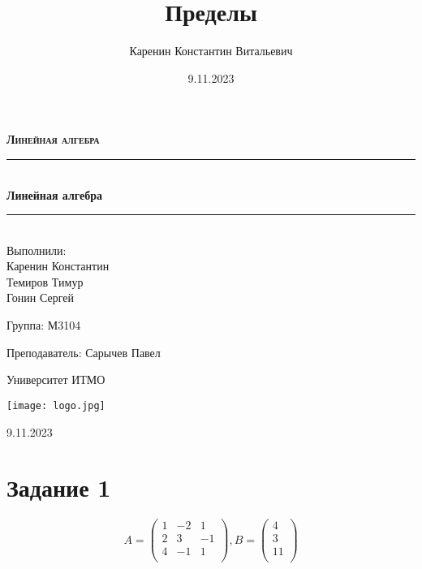 \documentclass{article}
\title{Пределы}
\author{Каренин Константин Витальевич}
\date{9.11.2023}
\begin{document}
\begin{titlepage}
    \centering
    \vspace*{0.5 cm}
    
    \textsc{\LARGE \textbf{Линейная алгебра}}
    \vspace{1.5cm}
    
    \rule{\linewidth}{0.2 mm} \\[0.4 cm]
    { \huge \bfseries Линейная алгебра}
    \rule{\linewidth}{0.2 mm} \\[1.5 cm]
    
    \Large Выполнили: \\
    Каренин Константин \\
    Темиров Тимур \\
    Гонин Сергей \\
    
    \vspace{0.5cm}
    
    Группа: М3104
    
    \vspace{0.5cm}
    
    Преподаватель: Сарычев Павел
    
    \vspace{0.5cm}
    
    Университет ИТМО
    
    \vfill

    \texttt{[image: logo.jpg]}
    
    9.11.2023
    
\end{titlepage}

\setcounter{page}{2}

\newpage
    \section{Задание 1}
    \[
    A = \begin{pmatrix}
        1 & -2 & 1 \\
        2 & 3 & -1 \\
        4 & -1 & 1 \\
    \end{pmatrix}
    ,
    B = \begin{pmatrix}
        4 \\
        3 \\
        11 \\
    \end{pmatrix}
    \]
   
\end{document}
